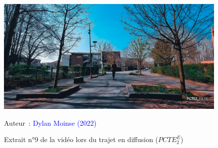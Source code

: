     \begin{figure}[h!]\vspace*{4pt}
        \caption*{Extrait n°9 de la vidéo lors du trajet en diffusion (\(PCTE^{E}_{2}\))}
        \centerline{\includegraphics[width=0.75\columnwidth]{src/Figures/Annexes/Extrait_Video_PCTE2_Egress_9.jpg}}
        \vspace{5pt}
        \begin{flushright}\scriptsize{
        Auteur~: \textcolor{blue}{Dylan Moinse (2022)}
        }\end{flushright}
    \end{figure}